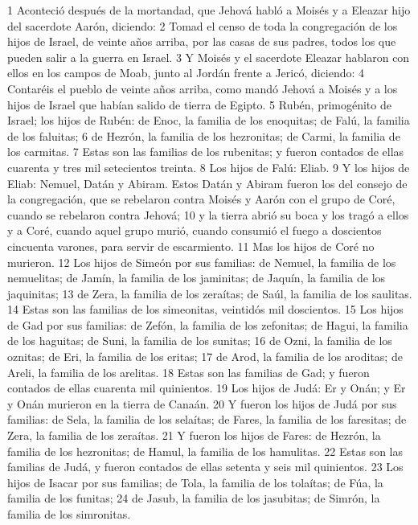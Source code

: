 1 Aconteció después de la mortandad, que Jehová habló a Moisés y a Eleazar hijo del sacerdote Aarón, diciendo:
2 Tomad el censo de toda la congregación de los hijos de Israel, de veinte años arriba, por las casas de sus padres, todos los que pueden salir a la guerra en Israel.
3 Y Moisés y el sacerdote Eleazar hablaron con ellos en los campos de Moab, junto al Jordán frente a Jericó, diciendo:
4 Contaréis el pueblo de veinte años arriba, como mandó Jehová a Moisés y a los hijos de Israel que habían salido de tierra de Egipto.
5 Rubén, primogénito de Israel; los hijos de Rubén: de Enoc, la familia de los enoquitas; de Falú, la familia de los faluitas;
6 de Hezrón, la familia de los hezronitas; de Carmi, la familia de los carmitas.
7 Estas son las familias de los rubenitas; y fueron contados de ellas cuarenta y tres mil setecientos treinta.
8 Los hijos de Falú: Eliab.
9 Y los hijos de Eliab: Nemuel, Datán y Abiram. Estos Datán y Abiram fueron los del consejo de la congregación, que se rebelaron contra Moisés y Aarón con el grupo de Coré, cuando se rebelaron contra Jehová;
10 y la tierra abrió su boca y los tragó a ellos y a Coré, cuando aquel grupo murió, cuando consumió el fuego a doscientos cincuenta varones, para servir de escarmiento.
11 Mas los hijos de Coré no murieron.
12 Los hijos de Simeón por sus familias: de Nemuel, la familia de los nemuelitas; de Jamín, la familia de los jaminitas; de Jaquín, la familia de los jaquinitas;
13 de Zera, la familia de los zeraítas; de Saúl, la familia de los saulitas.
14 Estas son las familias de los simeonitas, veintidós mil doscientos.
15 Los hijos de Gad por sus familias: de Zefón, la familia de los zefonitas; de Hagui, la familia de los haguitas; de Suni, la familia de los sunitas;
16 de Ozni, la familia de los oznitas; de Eri, la familia de los eritas;
17 de Arod, la familia de los aroditas; de Areli, la familia de los arelitas.
18 Estas son las familias de Gad; y fueron contados de ellas cuarenta mil quinientos.
19 Los hijos de Judá: Er y Onán; y Er y Onán murieron en la tierra de Canaán.
20 Y fueron los hijos de Judá por sus familias: de Sela, la familia de los selaítas; de Fares, la familia de los faresitas; de Zera, la familia de los zeraítas.
21 Y fueron los hijos de Fares: de Hezrón, la familia de los hezronitas; de Hamul, la familia de los hamulitas.
22 Estas son las familias de Judá, y fueron contados de ellas setenta y seis mil quinientos.
23 Los hijos de Isacar por sus familias; de Tola, la familia de los tolaítas; de Fúa, la familia de los funitas;
24 de Jasub, la familia de los jasubitas; de Simrón, la familia de los simronitas.
